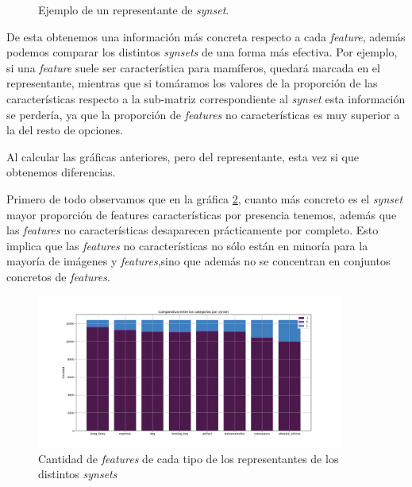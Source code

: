 \documentclass[12,twoside]{TFG-GM}
\theoremstyle{definition}
\theoremstyle{remark}
\begin{document}
\begin{figure}[ht]
\begin{center}
\end{center}
\caption{Ejemplo de un representante de \textit{synset}.
\label{fig:representante}}
\end{figure}

De esta obtenemos una información más concreta respecto a cada \textit{feature}, además podemos comparar los distintos \textit{synsets} de una forma más efectiva. Por ejemplo, si una \textit{feature} suele ser característica para mamíferos, quedará marcada en el representante, mientras que si tomáramos los valores de la proporción de las características respecto a la sub-matriz correspondiente al \textit{synset} esta información se perdería, ya que la proporción de \textit{features} no características es muy superior a la del resto de opciones.

Al calcular las gráficas anteriores, pero del representante, esta vez si que obtenemos diferencias. 

Primero de todo observamos que en la gráfica \ref{fig:comparativaCategoriasporSynset}, cuanto más concreto es el \textit{synset} mayor proporción de features características por presencia tenemos, además que las \textit{features} no características desaparecen prácticamente por completo. Esto implica que las \textit{features} no características no sólo están en minoría para la mayoría de imágenes y \textit{features},sino que además no se concentran en conjuntos concretos de \textit{features}.   
\begin{figure}[ht] 
	\centering
	\includegraphics[width=0.9\textwidth] {Images/plots/25/synsetslayer/Comparative_of_synsets.png}
	\caption{ Cantidad de \textit{features} de cada tipo de los representantes de los distintos \textit{synsets}
	\label{fig:comparativaCategoriasporSynset}}
\end{figure}
\end{document}
